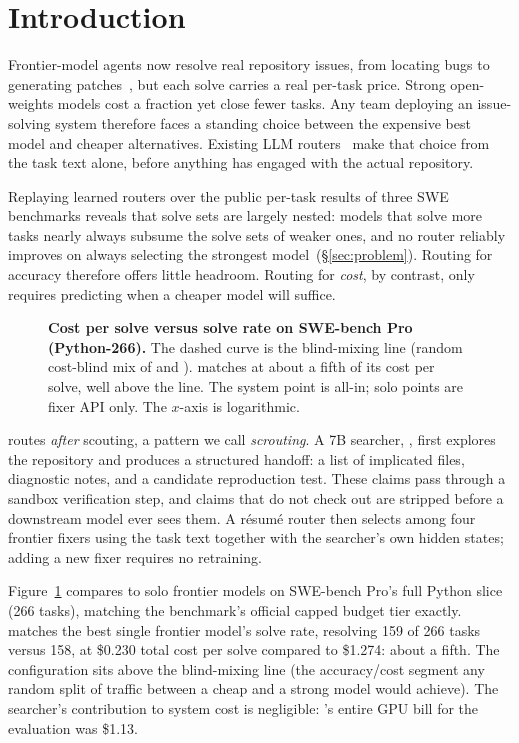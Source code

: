 \section{Introduction}
\label{sec:intro}

Frontier-model agents now resolve real repository issues, from locating
bugs to generating patches~\citep{swebench}, but each solve carries a
real per-task price.  Strong open-weights models cost a fraction yet
close fewer tasks.  Any team deploying an issue-solving system therefore
faces a standing choice between the expensive best model and cheaper
alternatives.  Existing LLM routers~\citep{routellm,frugalgpt} make
that choice from the task text alone, before anything has engaged with
the actual repository.

Replaying learned routers over the public per-task results of three SWE
benchmarks reveals that solve sets are largely nested: models that solve
more tasks nearly always subsume the solve sets of weaker ones, and no
router reliably improves on always selecting the strongest
model~(\S\ref{sec:problem}).  Routing for accuracy therefore offers
little headroom.  Routing for \emph{cost}, by contrast, only requires
predicting when a cheaper model will suffice.

\begin{figure}[!tbp]
\centering

\caption{\textbf{Cost per solve versus solve rate on SWE-bench Pro
(Python-266).}  The dashed curve is the blind-mixing line (random
cost-blind mix of \fxkimi and \fxopus).  \sysname matches \fxopus at
about a fifth of its cost per solve, well above the line.  The system
point is all-in; solo points are fixer API only.  The $x$-axis is
logarithmic.}
\label{fig:cost-solve}
\end{figure}

\sysname routes \emph{after} scouting, a pattern we call
\emph{scrouting}.  A 7B searcher,
\modelname, first explores the repository and produces a structured
handoff: a list of implicated files, diagnostic notes, and a candidate
reproduction test.  These claims pass through a sandbox verification
step, and claims that do not check out are stripped before a downstream
model ever sees them.
A r\'esum\'e router then selects among four frontier fixers using the
task text together with the searcher's own hidden states; adding a new
fixer requires no retraining.

Figure~\ref{fig:cost-solve} compares \sysname to solo frontier models on
SWE-bench Pro's full Python slice~\citep{swebenchpro} (266 tasks),
matching the benchmark's official capped budget tier exactly.  \sysname
matches the best single frontier model's solve rate, resolving 159 of
266 tasks versus 158, at \$0.230 total cost per solve compared to
\$1.274: about a fifth.  The configuration sits above the blind-mixing
line (the accuracy/cost segment any random split of traffic between a
cheap and a strong model would achieve).  The searcher's contribution to
system cost is negligible: \modelname's entire GPU bill for the
evaluation was \$1.13.

